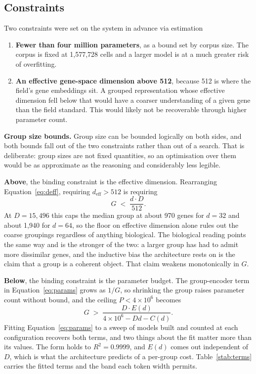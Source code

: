 \subsection{Constraints}

Two constraints were set on the system in advance via estimation
\begin{enumerate}
\item \textbf{Fewer than four million parameters}, as a bound set by corpus
size. The corpus is fixed at 1{,}577{,}728 cells and a larger model is at a 
much greater risk of overfitting.
\item \textbf{An effective gene-space dimension above 512}, because 512 is
where the field's gene embeddings sit. A grouped representation whose effective
dimension fell below that would have a coarser understanding of a given gene 
than the field standard. This would likely not be recoverable through higher 
parameter count.
\end{enumerate}

\textbf{Group size bounds.} Group size can be bounded logically on both sides,
and both bounds fall out of the two constraints rather than out of a search.
That is deliberate: group sizes are not fixed quantities, so an optimisation
over them would be as approximate as the reasoning and considerably less
legible.

\textbf{Above}, the binding constraint is the effective dimension.
Rearranging Equation~\ref{eq:deff}, requiring $d_{\mathrm{eff}} > 512$ is
requiring
\begin{equation}
G \;<\; \frac{d \cdot D}{512}.
\label{eq:gmax}
\end{equation}
At $D = 15{,}496$ this caps the median group at about 970 genes for $d = 32$
and about 1{,}940 for $d = 64$, so the floor on effective dimension alone
rules out the coarse groupings regardless of anything biological. The
biological reading points the same way and is the stronger of the two: a
larger group has had to admit more dissimilar genes, and the inductive bias
the architecture rests on is the claim that a group is a coherent object. That
claim weakens monotonically in $G$.

\textbf{Below}, the binding constraint is the parameter budget. The
group-encoder term in Equation~\ref{eq:params} grows as $1/G$, so shrinking
the group raises parameter count without bound, and the ceiling
$P < 4 \times 10^{6}$ becomes
\begin{equation}
G \;>\; \frac{D \cdot E(d)}{4 \times 10^{6} - D d - C(d)}.
\label{eq:gmin}
\end{equation}
Fitting Equation~\ref{eq:params} to a sweep of models built and counted at
each configuration recovers both terms, and two things about the fit matter
more than its values. The form holds to $R^2 = 0.9999$, and $E(d)$ comes out
independent of $D$, which is what the architecture predicts of a per-group
cost. Table~\ref{stab:terms} carries the fitted terms and the band each token
width permits.

